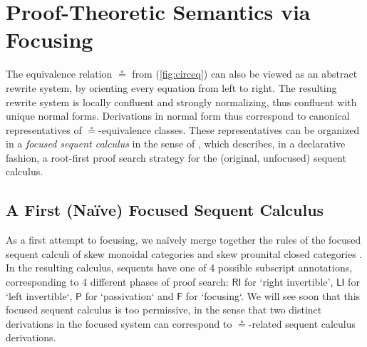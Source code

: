 \documentclass[copyright,creativecommons]{eptcs}
\theoremstyle{definition}
\newcommand{\RI}{\mathsf{RI}}
\newcommand{\LI}{\mathsf{LI}}
\newcommand{\Pass}{\mathsf{P}}
\newcommand{\F}{\mathsf{F}}
\begin{document}
\section{Proof-Theoretic Semantics via Focusing}
\label{sec:focus}

The equivalence relation $\circeq$ from (\ref{fig:circeq}) can also be viewed as an abstract rewrite system, by orienting every equation from left to right. The resulting rewrite system is locally confluent and strongly normalizing, thus confluent with unique normal forms. Derivations in normal form thus correspond to canonical representatives of $\circeq$-equivalence classes.
These representatives can be organized in a \emph{focused sequent calculus} in the sense of \cite{andreoli:logic:1992}, which describes, in a declarative fashion, a root-first proof search strategy for the (original, unfocused) sequent calculus.

\subsection{A First (Na{\"i}ve) Focused Sequent Calculus}
As a first attempt to focusing, we na{\"i}vely merge together the rules of the focused sequent calculi of skew monoidal categories \cite{uustalu:sequent:2021} and skew prounital closed categories \cite{uustalu:deductive:nodate}. In the resulting calculus, sequents have one of 4 possible subscript annotations, corresponding to 4 different phases of proof search: $\RI$ for `right invertible', $\LI$ for `left invertible`, $\Pass$ for `passivation` and $\F$ for `focusing`. We will see soon that this focused sequent calculus is too permissive, in the sense that two distinct derivations in the focused system can correspond to $\circeq$-related sequent calculus derivations.
\end{document}
